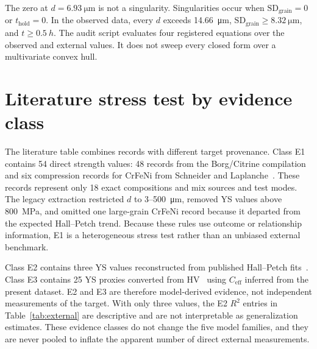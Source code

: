 \documentclass[a4paper,11pt]{article}
\begin{document}
The zero at $d=\SI{6.93}{\micro\meter}$ is not a singularity. Singularities occur when $\mathrm{SD}_{\mathrm{grain}}=0$ or $t_{\mathrm{hold}}=0$. In the observed data, every $d$ exceeds \SI{14.66}{\micro\meter}, $\mathrm{SD}_{\mathrm{grain}}\geq\SI{8.32}{\micro\meter}$, and $t\geq\SI{0.5}{h}$. The audit script evaluates four registered equations over the observed and external values. It does not sweep every closed form over a multivariate convex hull.

\section{Literature stress test by evidence class}
\label{si:external}

The literature table combines records with different target provenance. Class E1 contains 54 direct strength values: 48 records from the Borg/Citrine compilation~\cite{Borg2020} and six compression records for CrFeNi from Schneider and Laplanche~\cite{SchneiderCrFeNi2021}. These records represent only 18 exact compositions and mix sources and test modes. The legacy extraction restricted $d$ to 3--\SI{500}{\micro\meter}, removed YS values above \SI{800}{MPa}, and omitted one large-grain CrFeNi record because it departed from the expected Hall--Petch trend. Because these rules use outcome or relationship information, E1 is a heterogeneous stress test rather than an unbiased external benchmark.

Class E2 contains three YS values reconstructed from published Hall--Petch fits~\cite{Otto2013}. Class E3 contains 25 YS proxies converted from HV~\cite{HuangTY2019} using $C_{\mathrm{eff}}$ inferred from the present dataset. E2 and E3 are therefore model-derived evidence, not independent measurements of the target. With only three values, the E2 $R^2$ entries in Table~\ref{tab:external} are descriptive and are not interpretable as generalization estimates. These evidence classes do not change the five model families, and they are never pooled to inflate the apparent number of direct external measurements.
\end{document}
